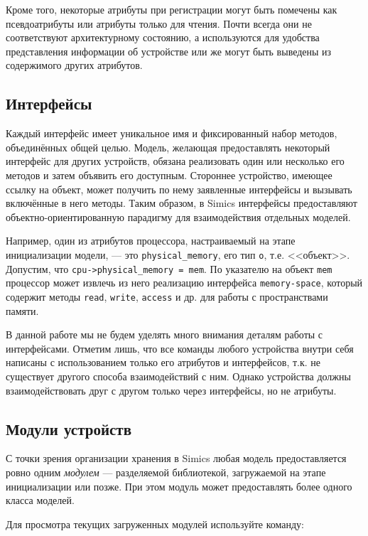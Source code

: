 Кроме того, некоторые атрибуты при регистрации могут быть помечены как псевдоатрибуты или атрибуты только для чтения. Почти всегда они не соответствуют архитектурному состоянию, а используются для удобства представления информации об устройстве или же могут быть выведены из содержимого других атрибутов.

\subsection{Интерфейсы}

Каждый интерфейс имеет уникальное имя и фиксированный набор методов, объединённых общей целью. Модель, желающая предоставлять некоторый интерфейс для других устройств, обязана реализовать один или несколько его методов и затем объявить его доступным. Стороннее устройство, имеющее ссылку на объект, может получить по нему заявленные интерфейсы и вызывать включённые в него методы. Таким образом, в Simics интерфейсы предоставляют объектно-ориентированную парадигму для взаимодействия отдельных моделей. 

Например, один из атрибутов процессора, настраиваемый на этапе инициализации модели, --- это \texttt{physical_memory}, его тип \texttt{o}, т.е. <<объект>>. Допустим, что \texttt{cpu->physical_memory = mem}. По указателю на объект \texttt{mem} процессор может извлечь из него реализацию интерфейса \texttt{memory-space}, который содержит методы \texttt{read}, \texttt{write}, \texttt{access} и др. для работы с пространствами памяти.

В данной работе мы не будем уделять много внимания  деталям работы с интерфейсами. Отметим лишь, что все команды любого устройства внутри себя написаны с использованием только его атрибутов и интерфейсов, т.к. не существует другого способа взаимодействий с ним. Однако устройства должны взаимодействовать друг с другом только через интерфейсы, но не атрибуты.

\subsection{Модули устройств}

С точки зрения организации хранения в Simics любая модель предоставляется ровно одним \textit{модулем} --- разделяемой библиотекой, загружаемой на этапе инициализации или позже. При этом модуль может предоставлять более одного класса моделей.

Для просмотра текущих загруженных модулей используйте команду:

